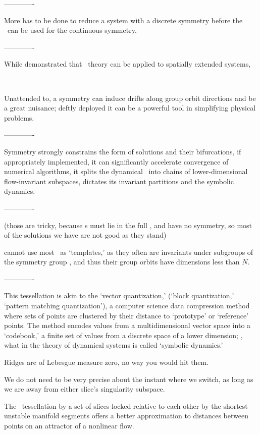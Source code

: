 -------------

More has to be done to reduce a system with a discrete
symmetry before the \mslices\ can be used for the continuous symmetry.

-------------

While  demonstrated that \po\ theory can be
applied to spatially extended systems,

-------------

Unattended to, a symmetry can induce drifts along group orbit directions
and be a great nuisance; deftly deployed it can be a powerful tool in
simplifying physical problems.

-------------

Symmetry strongly constrains the form of solutions and their
bifurcations, if appropriately implemented, it can significantly
accelerate convergence of numerical algorithms, it splits the dynamical
\statesp\ into chains of lower-dimensional flow-invariant subspaces,
dictates its invariant partitions and the symbolic dynamics.

-------------

(those are tricky, because {\template s} must lie in the full
\statesp, and have no symmetry, so most of the solutions we have are not
good as they stand)

cannot use most \eqva\ as `templates,' as they often 	are invariants
under subgroups of the symmetry group \Group, and 	thus their group
orbits have dimensions less than $N$.

-------------

 This tessellation is akin to the
{`vector quantization,'} (`block quantization,'  `pattern matching quantization'),
a computer science data compression method where sets of points are
clustered by their distance to `prototype' or `reference' points. The
method encodes values from a multidimensional vector space into a
`codebook,' a finite set of values from a discrete space of a lower
dimension; \ie, what in the theory of dynamical systems is called
`symbolic dynamics.'

Ridges are of Lebesgue measure zero, no way you would hit them.

We do not need to be very precise about the instant
where we switch, as long as we are away from either slice's singularity
subspace.

The \reducedsp\ tessellation by a set of slices
locked relative to each other by the shortest unstable manifold segments
offers a better approximation to distances between points on an attractor
of a nonlinear flow.

